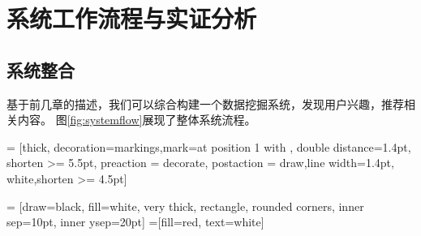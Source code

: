 \chapter{系统工作流程与实证分析}
\section{系统整合}
基于前几章的描述，我们可以综合构建一个数据挖掘系统，发现用户兴趣，推荐相关内容。
图\ref{fig:systemflow}展现了整体系统流程。

\usetikzlibrary{shapes,snakes}
\usetikzlibrary{arrows, decorations.markings}

 = [thick, decoration={markings,mark=at position
   1 with {}},
   double distance=1.4pt, shorten >= 5.5pt,
   preaction = {decorate},
   postaction = {draw,line width=1.4pt, white,shorten >= 4.5pt}]

 = [draw=black, fill=white, very thick,
    rectangle, rounded corners, inner sep=10pt, inner ysep=20pt]
 =[fill=red, text=white]

\def\html{
    \draw[rounded corners=0.1ex,fill=white,thick] (0.2,0.2) rectangle (1.2,1.5);
    \draw[rounded corners=0.1ex,fill=white,thick] (0.1,0.1) rectangle (1.1,1.4);
    \draw[rounded corners=0.1ex,fill=white,thick] (0,0) rectangle (1,1.3);
    \node at (0.5,0.3) {\tiny HTML};
}

